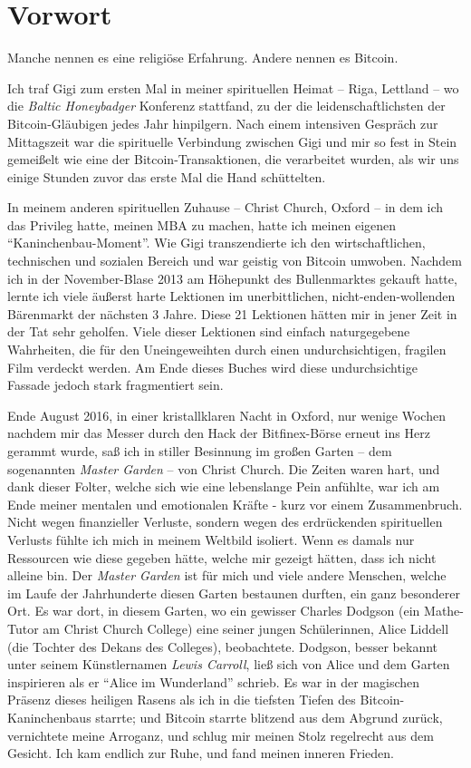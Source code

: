 \chapter*{Vorwort}

Manche nennen es eine religiöse Erfahrung. Andere nennen es Bitcoin.

Ich traf Gigi zum ersten Mal in meiner spirituellen Heimat -- Riga, Lettland --
wo die \textit{Baltic Honeybadger} Konferenz stattfand, zu der die
leidenschaftlichsten der Bitcoin-Gläubigen jedes Jahr hinpilgern. Nach einem
intensiven Gespräch zur Mittagszeit war die spirituelle Verbindung zwischen Gigi
und mir so fest in Stein gemeißelt wie eine der Bitcoin-Transaktionen, die
verarbeitet wurden, als wir uns einige Stunden zuvor das erste Mal die Hand
schüttelten.

In meinem anderen spirituellen Zuhause -- Christ Church, Oxford -- in dem ich
das Privileg hatte, meinen MBA zu machen, hatte ich meinen eigenen
\enquote{Kaninchenbau-Moment}. Wie Gigi transzendierte ich den wirtschaftlichen,
technischen und sozialen Bereich und war geistig von Bitcoin umwoben. Nachdem
ich in der November-Blase 2013 am Höhepunkt des Bullenmarktes gekauft hatte,
lernte ich viele äußerst harte Lektionen im unerbittlichen,
nicht-enden-wollenden Bärenmarkt der nächsten 3 Jahre. Diese 21 Lektionen hätten
mir in jener Zeit in der Tat sehr geholfen. Viele dieser Lektionen sind einfach
naturgegebene Wahrheiten, die für den Uneingeweihten durch einen
undurchsichtigen, fragilen Film verdeckt werden. Am Ende dieses Buches wird
diese undurchsichtige Fassade jedoch stark fragmentiert sein.

Ende August 2016, in einer kristallklaren Nacht in Oxford, nur wenige Wochen
nachdem mir das Messer durch den Hack der Bitfinex-Börse erneut ins Herz
gerammt wurde, saß ich in stiller Besinnung im großen Garten -- dem
sogenannten \textit{Master Garden} -- von Christ Church. Die Zeiten waren hart,
und dank dieser Folter, welche sich wie eine lebenslange Pein anfühlte, war ich
am Ende meiner mentalen und emotionalen Kräfte - kurz vor einem Zusammenbruch.
Nicht wegen finanzieller Verluste, sondern wegen des erdrückenden spirituellen
Verlusts fühlte ich mich in meinem Weltbild isoliert. Wenn es damals nur
Ressourcen wie diese gegeben hätte, welche mir gezeigt hätten, dass ich nicht
alleine bin. Der \textit{Master Garden} ist für mich und viele andere Menschen,
welche im Laufe der Jahrhunderte diesen Garten bestaunen durften, ein ganz
besonderer Ort. Es war dort, in diesem Garten, wo ein gewisser Charles Dodgson
(ein Mathe-Tutor am Christ Church College) eine seiner jungen Schülerinnen,
Alice Liddell (die Tochter des Dekans des Colleges), beobachtete. Dodgson,
besser bekannt unter seinem Künstlernamen \textit{Lewis Carroll}, ließ sich von
Alice und dem Garten inspirieren als er \enquote{Alice im Wunderland} schrieb.
Es war in der magischen Präsenz dieses heiligen Rasens als ich in die tiefsten
Tiefen des Bitcoin-Kaninchenbaus starrte; und Bitcoin starrte blitzend aus dem
Abgrund zurück, vernichtete meine Arroganz, und schlug mir meinen Stolz
regelrecht aus dem Gesicht. Ich kam endlich zur Ruhe, und fand meinen inneren
Frieden.

